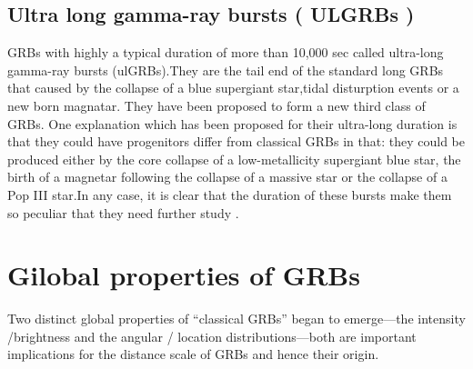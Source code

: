 \subsection{Ultra long gamma-ray bursts ( ULGRBs )}
GRBs with highly a typical duration of more than 10,000 sec called ultra-long gamma-ray bursts (ulGRBs).They are the tail end of the standard long GRBs that caused by the collapse of a blue supergiant star,tidal disturption events or a new born magnatar. They have been proposed to form a new third class of GRBs. One explanation which has been proposed for their ultra-long duration is that they could have progenitors differ from classical GRBs in that: they could be produced either by the core collapse of a low-metallicity supergiant blue star, the birth of a magnetar following the collapse of a massive star or the collapse of a Pop III star.In any case, it is clear that the duration of these bursts make them so peculiar that they need further study \citep{10}\citep{11}.
\section{Gilobal properties of GRBs}
Two distinct global properties of “classical GRBs” began to emerge—the intensity /brightness and the angular / location distributions—both are important implications for the distance scale of GRBs and hence their origin.
